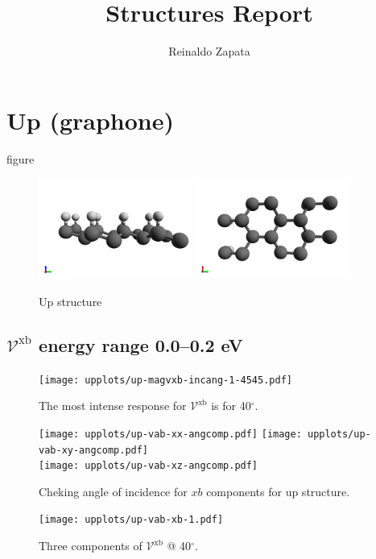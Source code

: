 \documentclass{article}
\title{Structures Report}
\author{Reinaldo Zapata}
\date{}
\let\Oldsection\section
\renewcommand{\section}{\FloatBarrier\Oldsection}
\let\Oldsubsection\subsection
\renewcommand{\subsection}{\FloatBarrier\Oldsubsection}
\begin{document}
\maketitle


\section{Up (graphone)} %
\label{sec:up}
figure

\begin{figure}[h!]
    \centering
    \includegraphics[width=0.45\textwidth]{../up/up-figures/up-1}
    \includegraphics[width=0.45\textwidth]{../up/up-figures/up-2}
    \caption{Up structure}
    \label{fig:upstruc}
\end{figure}

\subsection{$\mathcal{V}^{\mathrm{xb}}$ energy range 0.0--0.2 eV }
\begin{figure}[h]
    \centering
    \texttt{[image: upplots/up-magvxb-incang-1-4545.pdf]}
    \caption{The most intense response for $\mathcal{V}^{\mathrm{xb}} $ is for 
    40$^{\circ}$.}
    \label{fig:up-magvxbincang1}
\end{figure}
\begin{figure}[h]
    \centering
    \texttt{[image: upplots/up-vab-xx-angcomp.pdf]}
    \texttt{[image: upplots/up-vab-xy-angcomp.pdf]}\\
    \texttt{[image: upplots/up-vab-xz-angcomp.pdf]}
    \caption{Cheking angle of incidence for $xb$ components for up structure.}
    \label{fig:up-xbangcomp}
\end{figure}
\begin{figure}[tb]
    \centering
    \texttt{[image: upplots/up-vab-xb-1.pdf]}
    \caption{Three components of $\mathcal{V}^{\mathrm{xb}} $ @ 40$^{\circ}$.}
    \label{fig:up-vxb1}
\end{figure}
\end{document}
